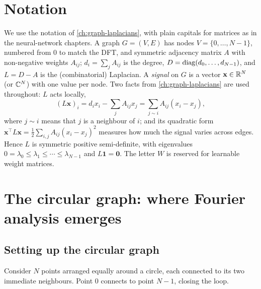 \begin{notechapter}
\section{Notation}

We use the notation of \cref{ch:graph-laplacians}, with plain capitals for matrices as in the neural-network chapters. A graph $G = (V, E)$ has nodes $V = \{0, \ldots, N-1\}$, numbered from $0$ to match the DFT, and symmetric adjacency matrix $A$ with non-negative weights $A_{ij}$; $d_i = \sum_j A_{ij}$ is the degree, $D = \operatorname{diag}(d_0, \ldots, d_{N-1})$, and $L = D - A$ is the (combinatorial) Laplacian. A \emph{signal} on $G$ is a vector $\mathbf{x} \in \mathbb{R}^N$ (or $\mathbb{C}^N$) with one value per node. Two facts from \cref{ch:graph-laplacians} are used throughout: $L$ acts locally,
\begin{equation}
(L\mathbf{x})_i = d_i x_i - \sum_{j} A_{ij} x_j = \sum_{j \sim i} A_{ij}(x_i - x_j),
\label{dft-to-gnn:eq:local}
\end{equation}
where $j \sim i$ means that $j$ is a neighbour of $i$; and its quadratic form $\mathbf{x}^\top L \mathbf{x} = \frac12\sum_{i,j} A_{ij}(x_i - x_j)^2$ measures how much the signal varies across edges. Hence $L$ is symmetric positive semi-definite, with eigenvalues $0 = \lambda_0 \le \lambda_1 \le \cdots \le \lambda_{N-1}$ and $L\mathbf{1} = \mathbf{0}$. The letter $W$ is reserved for learnable weight matrices.

\section{The circular graph: where Fourier analysis emerges}

\subsection{Setting up the circular graph}

Consider $N$ points arranged equally around a circle, each connected
to its two immediate neighbours. Point $0$ connects to point $N-1$,
closing the loop.

\begin{figure}[H]
\centering
{}
\end{figure}
\end{notechapter}
